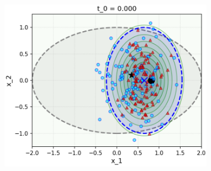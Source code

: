 \documentclass[../../book-main.tex]{subfiles}
\begin{document}
\begin{example}
\begin{figure}[tbp]
    \hfill
    \begin{subfigure}{0.32\textwidth}
      \includegraphics[width=\linewidth]{figs_chap5/samples_step_100_t_0_largenoise.png}
    \end{subfigure}

    \vspace{2mm} %


\end{figure}
\end{example}
\end{document}
